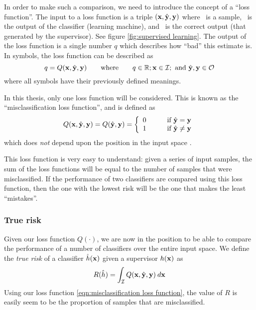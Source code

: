 In order to make such a comparison, we need to introduce the concept
of a ``loss function''.  The input to a loss function is a triple
$(\mathbf{x}, \hat{\mathbf{y}}, \mathbf{y})$ where \bfx\ is a sample, \bfyh\ is the
output of the classifier (learning machine), and \bfy\ is the correct output (that generated by the supervisor).  See figure \ref{fig:supervised
learning}.  The output of the loss function is a single number $q$
which describes how ``bad'' this estimate is.  In symbols, the loss
function can be described as
%
\begin{equation}
q = Q(\mathbf{x}, \hat{\mathbf{y}}, \mathbf{y}) \qquad \mbox{where} \qquad q \in \mathbb{R};
\mathbf{x} \in \mathcal{I}; \mbox{ and }\hat{\mathbf{y}}, \mathbf{y} \in \mathcal{O}
\end{equation}
%
where all symbols have their previously defined meanings.

In this thesis, only one loss function will be considered.  This is
known as the ``misclassification loss function'', and is defined as
%
\begin{equation}
Q(\mathbf{x}, \hat{\mathbf{y}}, \mathbf{y}) = Q(\hat{\mathbf{y}}, \mathbf{y}) = \left\{
\begin{array}{ll}
	0	&	\qquad \mbox{if $\hat{\mathbf{y}} = \mathbf{y}$} \\
	1	&	\qquad \mbox{if $\hat{\mathbf{y}} \neq \mathbf{y}$}
\end{array}
\right.
\label{eqn:misclassification loss function}
\end{equation}
%
which does \emph{not} depend upon the position in the input space \bfx.

This loss function is very easy to understand: given a series of input
samples, the sum of the loss functions will be equal to the number of
samples that were misclassified.  If the performance of two
classifiers are compared using this loss function, then the one with
the lowest risk will be the one that makes the least ``mistakes''.


\subsubsection{True risk}
Given our loss function $Q(\cdot)$, we are now in the position to be
able to compare the performance of a number of classifiers over the
entire input space.  We define the \emph{true risk} of a classifier
$\hat{h}(\mathbf{x})$ given a supervisor $h(\mathbf{x})$ as
%
\begin{equation}
R(\hat{h}) = \int_{\mathcal{I}} Q(\mathbf{x}, \hat{\mathbf{y}}, \mathbf{y}) \: d\mathbf{x}
\label{eqn:true risk}
\end{equation}
%
Using our loss function \ref{eqn:misclassification loss function}, the
value of $R$ is easily seem to be the proportion of samples that are
misclassified.

